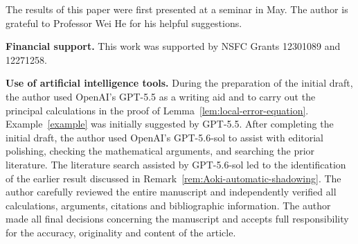 \documentclass[12pt]{amsart}
\theoremstyle{definition}
\numberwithin{equation}{section}
\theoremstyle{remark}
\begin{document}
\noindent The results of this paper were first presented at a seminar in
May. The author is grateful to Professor Wei He for his helpful suggestions.

\noindent\textbf{Financial support.}
This work was supported by NSFC Grants 12301089 and 12271258.

\noindent\textbf{Use of artificial intelligence tools.}
During the preparation of the initial draft, the author used OpenAI's
GPT-5.5 as a writing aid and to carry out the principal calculations in the
proof of Lemma~\ref{lem:local-error-equation}. Example~\ref{example} was
initially suggested by GPT-5.5. After completing the initial draft, the
author used OpenAI's GPT-5.6-sol to assist
with editorial polishing, checking the mathematical arguments, and
searching the prior literature. The literature search assisted by
GPT-5.6-sol led to the identification of the earlier result discussed in
Remark~\ref{rem:Aoki-automatic-shadowing}. The author carefully reviewed
the entire manuscript and independently verified all calculations,
arguments, citations and bibliographic information. The author made all
final decisions concerning the manuscript and accepts full responsibility
for the accuracy, originality and content of the article.
\end{document}
